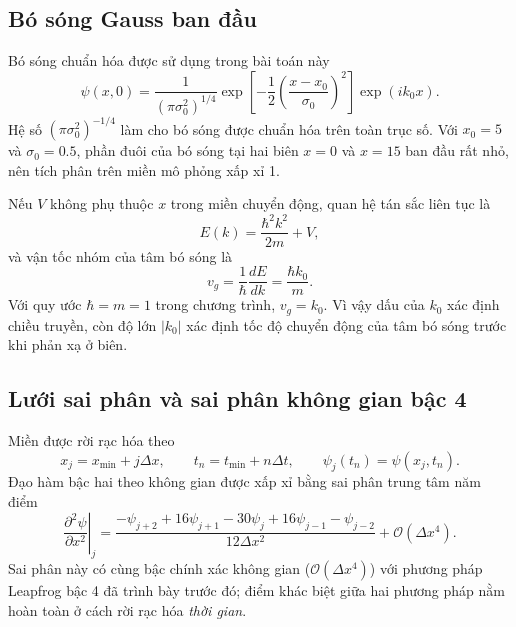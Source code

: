 \documentclass[12pt,a4paper]{article}
\begin{document}
\subsection{Bó sóng Gauss ban đầu}

Bó sóng chuẩn hóa được sử dụng trong bài toán này
\begin{equation}
    \psi(x,0)=\frac{1}{(\pi\sigma_0^2)^{1/4}}
    \exp\left[-\frac{1}{2}\left(\frac{x-x_0}{\sigma_0}\right)^2\right]
    \exp(ik_0x).
    \label{eq:gaussian}
\end{equation}
Hệ số $(\pi\sigma_0^2)^{-1/4}$ làm cho bó sóng được chuẩn hóa trên toàn trục số. Với $x_0=5$ và $\sigma_0=0.5$, phần đuôi của bó sóng tại hai biên $x=0$ và $x=15$ ban đầu rất nhỏ, nên tích phân trên miền mô phỏng xấp xỉ 1.

Nếu $V$ không phụ thuộc $x$ trong miền chuyển động, quan hệ tán sắc liên tục là
\begin{equation}
    E(k)=\frac{\hbar^2k^2}{2m}+V,
\end{equation}
và vận tốc nhóm của tâm bó sóng là
\begin{equation}
    v_g=\frac{1}{\hbar}\frac{dE}{dk}=\frac{\hbar k_0}{m}.
    \label{eq:vg}
\end{equation}
Với quy ước $\hbar=m=1$ trong chương trình, $v_g=k_0$. Vì vậy dấu của $k_0$ xác định chiều truyền, còn độ lớn $|k_0|$ xác định tốc độ chuyển động của tâm bó sóng trước khi phản xạ ở biên.

\subsection{Lưới sai phân và sai phân không gian bậc 4}

Miền được rời rạc hóa theo
\begin{equation}
    x_j=x_{\min}+j\Delta x,\qquad
    t_n=t_{\min}+n\Delta t,\qquad
    \psi_j(t_n)=\psi(x_j,t_n).
\end{equation}
Đạo hàm bậc hai theo không gian được xấp xỉ bằng sai phân trung tâm năm điểm
\begin{equation}
    \left.\frac{\partial^2\psi}{\partial x^2}\right|_j
    =\frac{-\psi_{j+2}+16\psi_{j+1}-30\psi_j
    +16\psi_{j-1}-\psi_{j-2}}{12\Delta x^2}
    +\mathcal O(\Delta x^4).
    \label{eq:space4}
\end{equation}
Sai phân này có cùng bậc chính xác không gian ($\mathcal O(\Delta x^4)$) với phương pháp Leapfrog bậc 4 đã trình bày trước đó; điểm khác biệt giữa hai phương pháp nằm hoàn toàn ở cách rời rạc hóa \emph{thời gian}.
\end{document}

